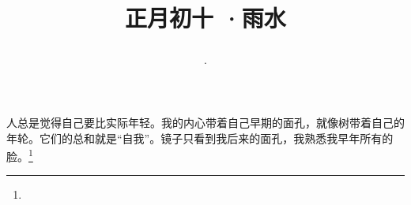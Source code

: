 \title{\date[d=19,m=2,y=2024][year:cn-y,年,month:cn,day:cn,日,·,weekday]·正月初十 ·雨水}
人总是觉得自己要比实际年轻。我的内心带着自己早期的面孔，就像树带着自己的年轮。它们的总和就是“自我”。镜子只看到我后来的面孔，我熟悉我早年所有的脸。\footnote{ }

